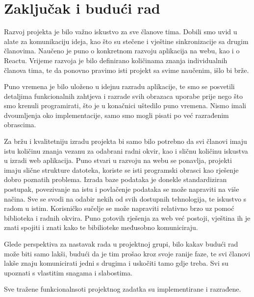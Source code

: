 \chapter{Zaključak i budući rad}

\par Razvoj projekta je bilo važno iskustvo za sve članove tima. Dobili smo uvid u alate za komunikaciju
ideja, kao što su stečene i vještine sinkronizacije sa drugim članovima. Naučeno je puno o konkretnom razvoju
aplikacija na webu, kao i o Reactu. Vrijeme razvoja je bilo definirano količinama znanja individualnih članova tima, 
te da ponovno pravimo isti projekt sa svime naučenim, išlo bi brže.
\par Puno vremena je bilo uloženo u idejnu razradu aplikacije, te smo se posvetili detaljima funkcionalnih
zahtjeva i razrade svih obrazaca uporabe prije nego što smo krenuli programirati, što je u konačnici uštedilo
puno vremena. Nismo imali dvoumljenja oko implementacije, samo smo mogli pisati po već razrađenim
obrascima. 
\par Za bržu i kvalitetniju izradu projekta bi samo bilo potrebno da svi članovi imaju istu količinu
znanja vezanu za odabrani radni okvir, kao i sličnu količinu iskustva u izradi web aplikacija. Puno stvari
u razvoju na webu se ponavlja, projekti imaju slične strukture datoteka, koriste se isti programski obrasci
kao rješenje dobro poznatih problema. Izrada baze podataka je donekle standardiziran postupak, 
povezivanje na istu i povlačenje podataka se može napraviti na više načina. Sve se svodi na odabir nekih od 
svih dostupnih tehnologija, te iskustvo s radom u istim. Korisničko sučelje se može napraviti relativno brzo
uz pomoć biblioteka i radnih okvira. Puno gotovih rješenja za web već postoji, vještina ih je znati spojiti
i znati kako te bibilioteke međusobno komuniciraju. 
\par Glede perspektiva za nastavak rada u projektnoj grupi, bilo kakav budući rad može biti samo lakši,
budući da je tim prošao kroz svoje ranije faze, te svi članovi lakše znaju komunicirati jedni s drugima i 
uskočiti tamo gdje treba. Svi su upoznati s vlastitim snagama i slabostima.
\par Sve tražene funkcionalnsoti projektnog zadatka su implementirane i razrađene. 


\eject